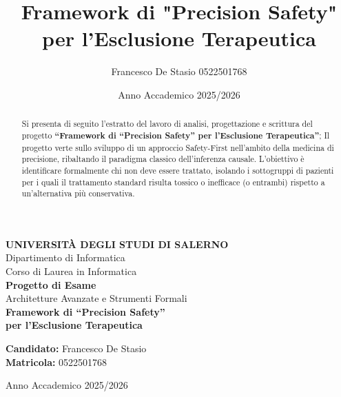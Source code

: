 \documentclass{article}
\title{Framework di "Precision Safety" per l’Esclusione Terapeutica}
\author{Francesco De Stasio 0522501768}
\date{Anno Accademico 2025/2026}
\begin{document}
\begin{titlepage}
    \begin{center}
        \LARGE \textbf{UNIVERSITÀ DEGLI STUDI DI SALERNO} \\
        \large Dipartimento di Informatica \\
        \vspace{0.5cm}
        \normalsize Corso di Laurea in Informatica \\
        \vspace{1.5cm}
        \vspace{1cm}
        \LARGE \textbf{Progetto di Esame} \\
        \vspace{0.5cm}
        \Large Architetture Avanzate e Strumenti Formali \\
        \vspace{1.8cm}
        \huge \textbf{Framework di ``Precision Safety''\\ per l’Esclusione Terapeutica} \\
        \vspace{2.5cm}
    \end{center}
    
    \begin{flushleft}
        \large
        \textbf{Candidato:} Francesco De Stasio \\
        \textbf{Matricola:} 0522501768
    \end{flushleft}
    
    \vfill
    \begin{center}
        \large Anno Accademico 2025/2026
    \end{center}
\end{titlepage}

\newpage

\begin{abstract}
    Si presenta di seguito l'estratto del lavoro di analisi, progettazione e scrittura del progetto \textbf{``Framework di ``Precision Safety'' per l’Esclusione Terapeutica''}; Il progetto verte sullo sviluppo di un approccio Safety-First nell’ambito della medicina di precisione, ribaltando il paradigma classico dell’inferenza causale. L’obiettivo è identificare formalmente chi non deve essere trattato, isolando i sottogruppi di pazienti per i quali il trattamento standard risulta tossico o inefficace (o entrambi) rispetto a un’alternativa più conservativa.
\end{abstract}
\end{document}
